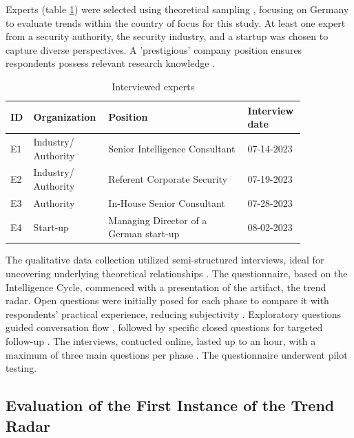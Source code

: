 \documentclass[10pt]{article}
\begin{document}
Experts (table \ref{tab:experts}) were selected using theoretical sampling \cite{Glaser.1967}, focusing on Germany to evaluate trends within the country of focus for this study. At least one expert from a security authority, the security industry, and a startup was chosen to capture diverse perspectives. A 'prestigious' company position ensures respondents possess relevant research knowledge \cite{Bogner.2002b}.

\begin{table}[hbtp]
    \caption{Interviewed experts}
    \begin{tabular}{p{0.05\linewidth}p{0.2\linewidth}p{0.45\linewidth}p{0.15\linewidth}}
        \toprule
        \textbf{ID} & \textbf{Organization} & \textbf{Position}                      & \textbf{Interview date} \\
        \hline
        E1          & Industry/ Authority   & Senior Intelligence Consultant         & 07-14-2023              \\
        \hline
        E2          & Industry/ Authority   & Referent Corporate Security            & 07-19-2023              \\
        \hline
        E3          & Authority             & In-House Senior Consultant             & 07-28-2023              \\
        \hline
        E4          & Start-up              & Managing Director of a German start-up & 08-02-2023              \\
        \bottomrule
    \end{tabular}
    \label{tab:experts}
\end{table}
The qualitative data collection utilized semi-structured interviews, ideal for uncovering underlying theoretical relationships \cite{Bogner.2014}. The questionnaire, based on the Intelligence Cycle, commenced with a presentation of the artifact, the trend radar. Open questions were initially posed for each phase to compare it with respondents' practical experience, reducing subjectivity \cite{Saunders.2012}. Exploratory questions guided conversation flow \cite{Saunders.2012}, followed by specific closed questions for targeted follow-up \cite{Saunders.2012}. The interviews, contucted online, lasted up to an hour, with a maximum of three main questions per phase \cite{Bogner.2014}. The questionnaire underwent pilot testing.

\subsection{Evaluation of the First Instance of the Trend Radar}
\end{document}
